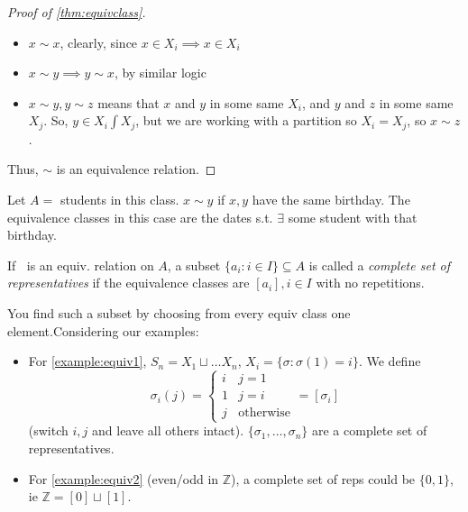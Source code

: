 \documentclass[12pt,oneside]{article}
\begin{document}
\begin{proof}[Proof of \cref{thm:equivclass}]
 \begin{itemize}
  \item $x\sim x$, clearly, since $x \in X_i \implies x \in X_i$
  \item $x \sim y \implies y \sim x$, by similar logic
  \item $x \sim y, y \sim z$ means that $x$ and $y$ in some same $X_i$, and $y$ and $z$ in some same $X_j$. So, $y \in X_i \int X_j$, but we are working with a partition so $X_i = X_j$, so $x \sim z$.
 \end{itemize}

 Thus, $\sim$ is an equivalence relation.\footnotemark
\end{proof}

\begin{example}
  Let $A = $ students in this class. $x \sim y$ if $x, y$ have the same birthday. The equivalence classes in this case are the dates s.t. $\exists$ some student with that birthday.
\end{example}

\begin{definition}
  If $~$ is an equiv. relation on $A$, a subset $\{a_i : i \in I\}\subseteq A$ is called a \emph{complete set of representatives} if the equivalence classes are $[a_i], i \in I$ with no repetitions.

  You find such a subset by choosing from every equiv class one element.Considering our examples:
  \begin{itemize}
    \item For \cref{example:equiv1}, $S_n = X_1 \sqcup \dots X_n$, $X_i = \{\sigma : \sigma(1) = i\}$. We define \[\sigma_i (j) = \begin{cases}
      i & j = 1\\
      1 & j = i\\
      j & \text{otherwise} 
    \end{cases} = [\sigma_i]\] (switch $i,j$ and leave all others intact). $\{\sigma_1, \dots, \sigma_n\}$ are a complete set of representatives.
    \item For \cref{example:equiv2} (even/odd in $\mathbb{Z}$), a complete set of reps could be $\{0,1\}$, ie $\mathbb{Z} = [0] \sqcup [1]$.
\end{itemize}
\end{definition}
\end{document}
